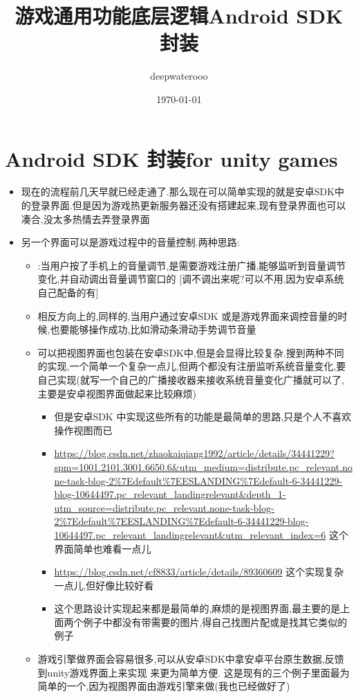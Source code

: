 \documentclass[9pt, b5paper]{article}
\author{deepwaterooo}
\date{\today}
\title{游戏通用功能底层逻辑Android SDK 封装}
\begin{document}
\maketitle
\tableofcontents


\section{Android SDK 封装for unity games}
\label{sec-1}
\begin{itemize}
\item 现在的流程前几天早就已经走通了.那么现在可以简单实现的就是安卓SDK中的登录界面.但是因为游戏热更新服务器还没有搭建起来,现有登录界面也可以凑合,没太多热情去弄登录界面
\item 另一个界面可以是游戏过程中的音量控制.两种思路:
\begin{itemize}
\item{}:当用户按了手机上的音量调节,是需要游戏注册广播,能够监听到音量调节变化,并自动调出音量调节窗口的 [调不调出来呢?可以不用,因为安卓系统自己配备的有]
\item{} 相反方向上的,同样的,当用户通过安卓SDK 或是游戏界面来调控音量的时候,也要能够操作成功,比如滑动条滑动手势调节音量
\item 可以把视图界面也包装在安卓SDK中,但是会显得比较复杂.搜到两种不同的实现,一个简单一个复杂一点儿,但两个都没有注册监听系统音量变化,要自己实现(就写一个自己的广播接收器来接收系统音量变化广播就可以了,主要是安卓视图界面做起来比较麻烦)
\begin{itemize}
\item 但是安卓SDK 中实现这些所有的功能是最简单的思路,只是个人不喜欢操作视图而已
\item \url{https://blog.csdn.net/zhaokaiqiang1992/article/details/34441229?spm=1001.2101.3001.6650.6&utm_medium=distribute.pc_relevant.none-task-blog-2\%7Edefault\%7EESLANDING\%7Edefault-6-34441229-blog-10644497.pc_relevant_landingrelevant&depth_1-utm_source=distribute.pc_relevant.none-task-blog-2\%7Edefault\%7EESLANDING\%7Edefault-6-34441229-blog-10644497.pc_relevant_landingrelevant&utm_relevant_index=6} 这个界面简单也难看一点儿
\item \url{https://blog.csdn.net/cf8833/article/details/89360609} 这个实现复杂一点儿,但好像比较好看
\item 这个思路设计实现起来都是最简单的,麻烦的是视图界面,最主要的是上面两个例子中都没有带需要的图片,得自己找图片配或是找其它类似的例子
\end{itemize}
\item 游戏引擎做界面会容易很多,可以从安卓SDK中拿安卓平台原生数据,反馈到unity游戏界面上来实现 来更为简单方便. 这是现有的三个例子里面最为简单的一个,因为视图界面由游戏引擎来做(我也已经做好了) 

\end{itemize}
\end{itemize}
\end{document}
